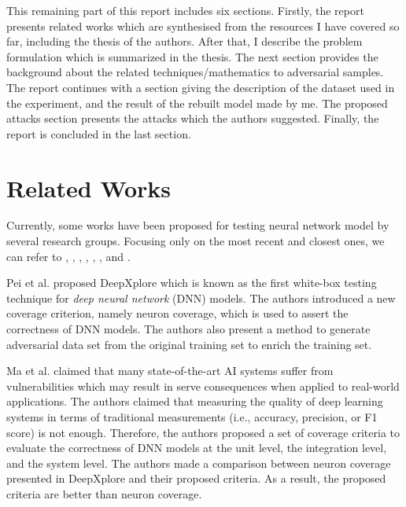 \documentclass[12pt]{article}
\begin{document}
This remaining part of this report includes six sections. Firstly, the report presents related works which are synthesised from the resources I have covered so far, including the thesis of the authors. After that, I describe the problem formulation which is summarized in the thesis. The next section provides the background about the related techniques/mathematics to adversarial samples. The report continues with a section giving the description of the dataset used in the experiment, and the result of the rebuilt model made by me. The proposed attacks section presents the attacks which the authors suggested. Finally, the report is concluded in the last section.

\section{Related Works}

Currently, some works have been proposed for testing neural network model by several
research groups. Focusing only on the most recent and closest ones, we can refer to \cite{DeepXplore}, \cite{deep-gauge}, \cite{deepct}, \cite{deeproad}, \cite{deeptest}, \cite{concolic-testing}, and \cite{coverage-limiation}.

Pei et al. proposed DeepXplore \cite{DeepXplore} which is known as the first white-box testing technique for \textit{deep neural network} (DNN) models. The authors introduced a new coverage criterion, namely neuron coverage, which is used to assert the correctness of DNN models. The authors also present a method to generate adversarial data set from the original training set to enrich the training set. %

Ma et al. \cite{deep-gauge} claimed that many state-of-the-art AI systems suffer from vulnerabilities which may result in serve consequences when applied to real-world applications. The authors claimed that measuring the quality of deep learning systems in terms of traditional measurements (i.e., accuracy, precision, or F1 score) is not enough. Therefore, the authors proposed a set of coverage criteria to evaluate the correctness of DNN models at the unit level, the integration level, and the system level. The authors made a comparison between neuron coverage presented in DeepXplore \cite{DeepXplore} and their proposed criteria. As a result, the proposed criteria are better than neuron coverage.
\end{document}
